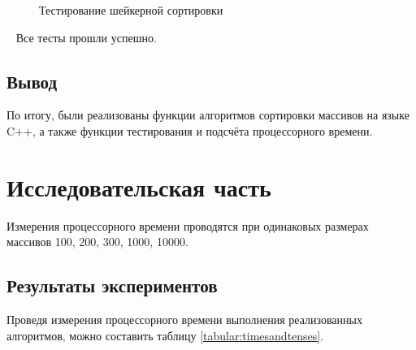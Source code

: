 \documentclass[12pt,a4paper]{report}
\begin{document}
\begin{figure}[h]
    \caption{Тестирование шейкерной сортировки}
    \label{fig:image}
\end{figure}

~
Все тесты прошли успешно.

\newpage
\section{Вывод}

По итогу, были реализованы функции алгоритмов сортировки массивов на языке C++, а также функции тестирования и подсчёта 
процессорного времени.

\newpage
\chapter{Исследовательская часть}

Измерения процессорного времени проводятся при одинаковых размерах массивов 100, 200, 300, 1000, 10000.

\section{Результаты экспериментов}

Проведя измерения процессорного времени выполнения реализованных алгоритмов, можно составить таблицу \ref{tabular:timesandtenses}.
\end{document}
